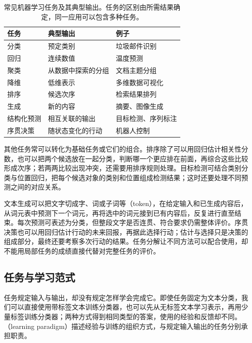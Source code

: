 \begin{table}[htbp]
  \centering
  \small
  \begin{tabularx}{\linewidth}{@{}llX@{}}
    \toprule
    任务 & 典型输出 & 例子 \\
    \midrule
    分类 & 预定类别 & 垃圾邮件识别 \\
    回归 & 连续数值 & 温度预测 \\
    聚类 & 从数据中探索的分组 & 文档主题分组 \\
    降维 & 低维表示 & 多维数据可视化 \\
    排序 & 候选次序 & 检索结果排列 \\
    生成 & 新的内容 & 摘要、图像生成 \\
    结构化预测 & 相互关联的输出 & 目标检测、序列标注 \\
    序贯决策 & 随状态变化的行动 & 机器人控制 \\
    \bottomrule
  \end{tabularx}
  \caption{常见机器学习任务及其典型输出。任务的区别由所需结果确定，同一应用可以包含多种任务。}
  \label{tab:common-ml-tasks}
\end{table}

其他任务常可以转化为基础任务或它们的组合。排序除了可以用回归估计相关性分数，也可以把两个候选放在一起分类，判断哪一个更应排在前面，再综合这些比较形成次序；若两两比较出现冲突，还需要用排序规则处理。目标检测可结合类别分类与位置回归，把每个候选对象的类别和位置组成检测结果；这时还要处理不同预测之间的对应关系。

文本生成可以把文字切成字、词或子词等（token），在给定输入和已生成内容后，从词元表中预测下一个词元，再将选中的词元接到已有内容后，反复进行直至结束。每次预测可表述为分类，但整段文字是否连贯、符合要求仍需整体评价。序贯决策也可以用回归估计行动的未来回报，再据此选择行动；估计与选择只是决策的组成部分，最终还要考察多次行动的结果。任务分解让不同方法可以配合使用，却不能用局部任务的成绩直接代替对完整任务的评价。

\subsection{任务与学习范式}
\label{sec:task-and-learning-paradigm}

任务规定输入与输出，却没有规定怎样学会完成它。即使任务固定为文本分类，我们可以直接使用带标签文本训练分类器，也可以先从无标签文本学习表示，再用少量标签训练分类器；两种方式得到相同类型的答案，使用的经验和反馈却不同。（learning paradigm）描述经验与训练的组织方式，与规定输入输出的任务分别承担职责。

